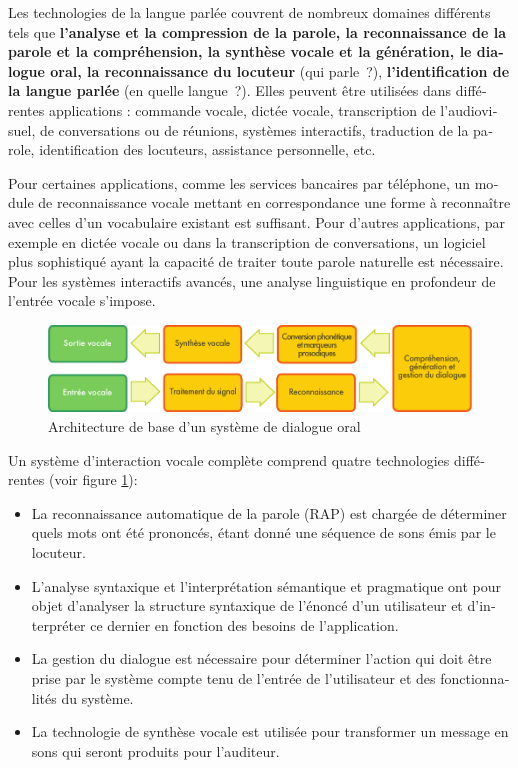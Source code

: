 \begin{french}
\begin{multicols}{2}
Les technologies de la langue parlée couvrent de nombreux domaines
différents tels que {\bf l'analyse et la compression de la
  parole, la reconnaissance de la parole et la compréhension, la
  synthèse vocale et la génération, le dialogue oral, la
  reconnaissance du locuteur} (qui parle~?), {\bf l'identification de la langue parlée} (en quelle langue~?). Elles
peuvent être utilisées dans différentes applications : commande
vocale, dictée vocale, transcription de l'audiovisuel, de
conversations ou de réunions, systèmes interactifs, traduction de la
parole, identification des locuteurs, assistance personnelle, etc.

Pour certaines applications, comme les services bancaires par
téléphone, un module de reconnaissance vocale mettant en
correspondance une forme à reconnaître avec celles d'un vocabulaire
existant est suffisant. Pour d'autres applications, par exemple en
dictée vocale ou dans la transcription de conversations, un logiciel
plus sophistiqué ayant la capacité de traiter toute parole naturelle
est nécessaire. Pour les systèmes interactifs avancés, une analyse
linguistique en profondeur de l'entrée vocale s'impose.

\begin{figure}[!ht]
\begin{center}
 \includegraphics[width=\textwidth]{../_media/french/simple_speech-based_dialogue_architecture} 
\caption{Architecture de base d'un système de dialogue oral}
\label{fig:slds}
\end{center}
\end{figure}

Un système d'interaction vocale complète comprend quatre technologies
différentes (voir figure \ref{fig:slds}):
\begin{itemize}
\item La reconnaissance automatique de la parole (RAP) est chargée de
  déterminer quels mots ont été prononcés, étant donné une
  séquence de sons émis par le locuteur.
\item L'analyse syntaxique et l'interprétation sémantique et
  pragmatique ont pour objet d'analyser la structure syntaxique de
  l'énoncé d'un utilisateur et d'interpréter ce dernier en fonction
  des besoins de l'application.
\item La gestion du dialogue est nécessaire pour déterminer l'action
  qui doit être prise par le système compte tenu de l'entrée de
  l'utilisateur et des fonctionnalités du système.
\item La technologie de synthèse vocale est utilisée pour transformer
  un message en sons qui seront produits pour l'auditeur.
\end{itemize}


\end{multicols}
\end{french}
